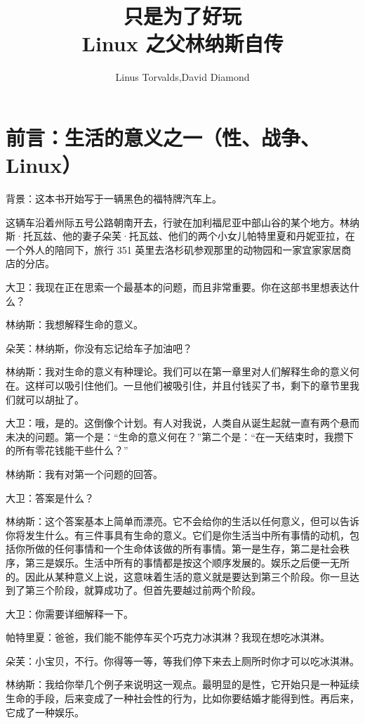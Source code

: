 \documentclass[12pt,UTF8]{ctexbook}
\title{\heiti\zihao{0} 只是为了好玩\\Linux 之父林纳斯自传}
\author{Linus Torvalds,David Diamond}
\date{}
\begin{document}
\maketitle
\tableofcontents

\frontmatter

\chapter{前言：生活的意义之一（性、战争、Linux）}

背景：这本书开始写于一辆黑色的福特牌汽车上。

这辆车沿着州际五号公路朝南开去，行驶在加利福尼亚中部山谷的某个地方。林纳斯·托瓦兹、他的妻子朵芙·托瓦兹、他们的两个小女儿帕特里夏和丹妮亚拉，在一个外人的陪同下，旅行 351 英里去洛杉矶参观那里的动物园和一家宜家家居商店的分店。

大卫：我现在正在思索一个最基本的问题，而且非常重要。你在这部书里想表达什么？

林纳斯：我想解释生命的意义。

朵芙：林纳斯，你没有忘记给车子加油吧？

林纳斯：我对生命的意义有种理论。我们可以在第一章里对人们解释生命的意义何在。这样可以吸引住他们。一旦他们被吸引住，并且付钱买了书，剩下的章节里我们就可以胡扯了。

大卫：哦，是的。这倒像个计划。有人对我说，人类自从诞生起就一直有两个悬而未决的问题。第一个是：“生命的意义何在？”第二个是：“在一天结束时，我攒下的所有零花钱能干些什么？”

林纳斯：我有对第一个问题的回答。

大卫：答案是什么？

林纳斯：这个答案基本上简单而漂亮。它不会给你的生活以任何意义，但可以告诉你将发生什么。有三件事具有生命的意义。它们是你生活当中所有事情的动机，包括你所做的任何事情和一个生命体该做的所有事情。第一是生存，第二是社会秩序，第三是娱乐。生活中所有的事情都是按这个顺序发展的。娱乐之后便一无所的。因此从某种意义上说，这意味着生活的意义就是要达到第三个阶段。你一旦达到了第三个阶段，就算成功了。但首先要越过前两个阶段。

大卫：你需要详细解释一下。

帕特里夏：爸爸，我们能不能停车买个巧克力冰淇淋？我现在想吃冰淇淋。

朵芙：小宝贝，不行。你得等一等，等我们停下来去上厕所时你才可以吃冰淇淋。

林纳斯：我给你举几个例子来说明这一观点。最明显的是性，它开始只是一种延续生命的手段，后来变成了一种社会性的行为，比如你要结婚才能得到性。再后来，它成了一种娱乐。
\end{document}
